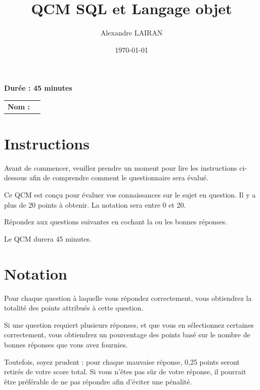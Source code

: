 \documentclass[12pt,a4paper]{article}
\title{QCM SQL et Langage objet} %
\author{Alexandre LAIRAN} %
\date{\today}
\begin{document}
\maketitle

\centering
\textbf{Durée : 45 minutes}
\par
\vspace{1cm} %

\begin{flushleft} %

    \begin{table}[h]
        \begin{tabular}{ll}
        \textbf{Nom :} & \underline{\hspace{5cm}} \\
        \end{tabular}
    \end{table}
\section*{Instructions}
Avant de commencer, veuillez prendre un moment pour lire les instructions ci-dessous afin de comprendre comment le questionnaire sera évalué.

Ce QCM est conçu pour évaluer vos connaissances sur le sujet en question. Il y a plus de 20 points à obtenir.
La notation sera entre 0 et 20.

Répondez aux questions suivantes en cochant la ou les bonnes réponses.

\vspace{1cm}
Le QCM durera 45 minutes.

\section*{Notation}

Pour chaque question à laquelle vous répondez correctement, vous obtiendrez la totalité des points attribués à cette question.

Si une question requiert plusieurs réponses, et que vous en sélectionnez certaines correctement, vous obtiendrez un pourcentage des points basé sur le nombre de bonnes réponses que vous avez fournies.

Toutefois, soyez prudent : pour chaque mauvaise réponse, 0,25 points seront retirés de votre score total. Si vous n'êtes pas sûr de votre réponse, il pourrait être préférable de ne pas répondre afin d'éviter une pénalité.


\end{flushleft}
\end{document}
